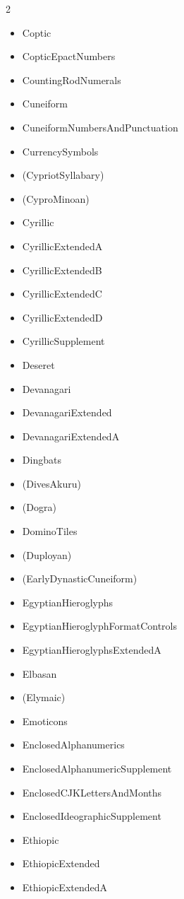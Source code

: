 \documentclass{article}
\newenvironment{itemlist}{%
  \begin{itemize}
  \setlength{\itemsep}{0pt}
  \setlength{\parsep}{0pt}
  \setlength{\topsep}{0pt}
  \setlength{\partopsep}{0pt}
  \setlength{\parskip}{0pt}
  \setlength{\labelsep}{5pt}}%
{
  \end{itemize}}
\begin{document}
\begin{multicols*}{2}
\begin{itemlist}
        \item Coptic
        \item CopticEpactNumbers
        \item CountingRodNumerals
        \item Cuneiform
        \item CuneiformNumbersAndPunctuation
        \item CurrencySymbols
        \item (CypriotSyllabary)
        \item (CyproMinoan)
        \item Cyrillic
        \item CyrillicExtendedA
        \item CyrillicExtendedB
        \item CyrillicExtendedC
        \item CyrillicExtendedD
        \item CyrillicSupplement
        \item Deseret
        \item Devanagari
        \item DevanagariExtended
        \item DevanagariExtendedA
        \item Dingbats
        \item (DivesAkuru)
        \item (Dogra)
        \item DominoTiles
        \item (Duployan)
        \item (EarlyDynasticCuneiform)
        \item EgyptianHieroglyphs
        \item EgyptianHieroglyphFormatControls
        \item EgyptianHieroglyphsExtendedA
        \item Elbasan
        \item (Elymaic)
        \item Emoticons
        \item EnclosedAlphanumerics
        \item EnclosedAlphanumericSupplement
        \item EnclosedCJKLettersAndMonths
        \item EnclosedIdeographicSupplement
        \item Ethiopic
        \item EthiopicExtended
        \item EthiopicExtendedA

\end{itemlist}
\end{multicols*}
\end{document}

